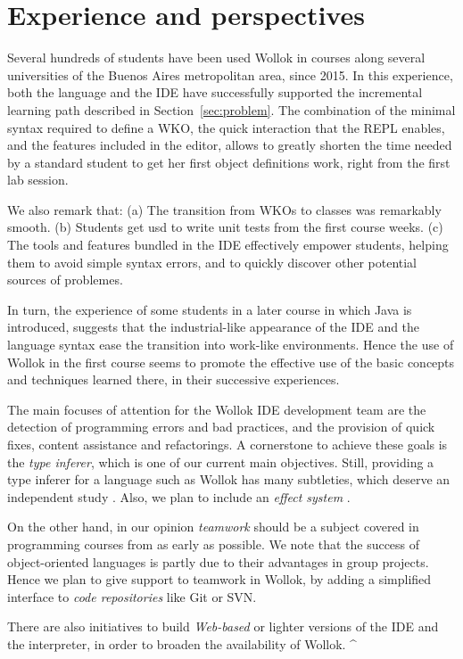 \section{Experience and perspectives}
\label{sec:experience-perspectives}

Several hundreds of students have been used Wollok in courses along several universities of the Buenos Aires metropolitan area, since 2015.
In this experience, both the language and the IDE have successfully supported the incremental learning path described in Section~\ref{sec:problem}.
The combination of the minimal syntax required to define a WKO, the quick interaction that the REPL enables, and the features included in the editor, allows to greatly shorten the time needed by a standard student to get her first object definitions work, right from the first lab session.

We also remark that:
(a) The transition from WKOs to classes was remarkably smooth.
(b) Students get usd to write unit tests from the first course weeks.
(c) The tools and features bundled in the IDE effectively empower students, helping them to avoid simple syntax errors, and to quickly discover other potential sources of problemes.

In turn, the experience of some students in a later course in which Java is introduced, suggests that the industrial-like appearance of the IDE and the language syntax ease the transition into work-like environments. Hence the use of Wollok in the first course seems to promote the effective use of the basic concepts and techniques learned there, in their successive experiences.

\medskip
The main focuses of attention for the Wollok IDE development team are the detection of programming errors and bad practices, and the provision of quick fixes, content assistance and refactorings.
A cornerstone to achieve these goals is the \emph{type inferer}, which is one of our current main objectives.
Still, providing a type inferer for a language such as Wollok has many subtleties, which deserve an independent study \cite{passerini_nicolas_extensible_2014}.
Also, we plan to include an \emph{effect system} \cite{nielson_type_1999}.

On the other hand, in our opinion \emph{teamwork} should be a subject covered in programming courses from as early as possible. We note that the success of object-oriented languages is partly due to their advantages in group projects. 
Hence we plan to give support to teamwork in Wollok, by adding a simplified interface to \emph{code repositories} like Git or SVN.

There are also initiatives to build \emph{Web-based} or lighter versions of the IDE and the interpreter, in order to broaden the availability of Wollok.
^%
























